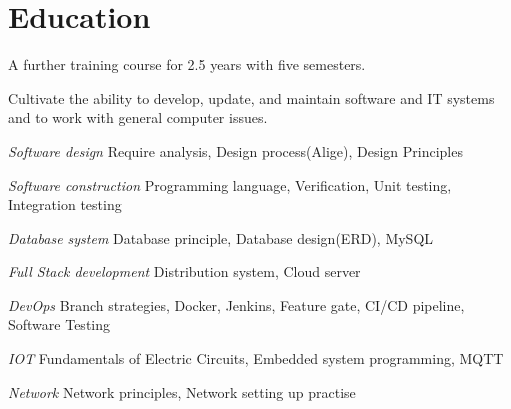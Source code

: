 \section{Education}

\begin{resume_list}
\item A further training course for 2.5 years with five semesters. 
\item Cultivate the ability to develop, update, and maintain software and IT systems and to work with general computer issues.
\end{resume_list}

\begin{resume_list}
	\item {\it Software design} {\hfill Require analysis, Design process(Alige), Design Principles}
	\item {\it Software construction}  {\hfill Programming language, Verification, Unit testing, Integration testing}
	\item {\it Database system} {\hfill Database principle, Database design(ERD), MySQL}
	\item {\it Full Stack development} {\hfill Distribution system, Cloud server}
	\item {\it DevOps} {\hfill Branch strategies, Docker, Jenkins, Feature gate, CI/CD pipeline, Software Testing}
	\item {\it IOT} {\hfill Fundamentals of Electric Circuits, Embedded system programming, MQTT}
	\item {\it Network} {\hfill Network principles, Network setting up practise}
\end{resume_list}
